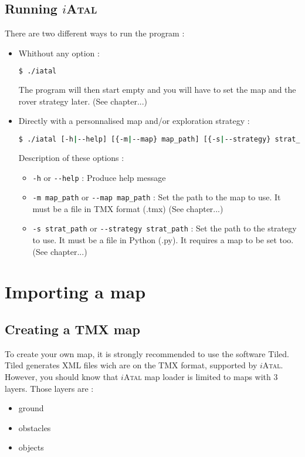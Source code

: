 \documentclass[a4paper,11pt]{article}
\newcommand\iAtal{$i$\textsc{Atal}}
\begin{document}
\subsection{Running \iAtal{}}
There are two different ways to run the program :
\begin{itemize}
\item Whithout any option :
\begin{lstlisting}[language=sh]
$ ./iatal
\end{lstlisting}
  The program will then start empty and you will have to set the map
  and the rover strategy later. (See chapter...)
  
\item Directly with a personnalised map and/or exploration strategy :
\begin{lstlisting}[language=sh]
$ ./iatal [-h|--help] [{-m|--map} map_path] [{-s|--strategy} strat_path]
\end{lstlisting}
  Description of these options :
  \begin{itemize}
  \item \verb!-h! or \verb!--help! : Produce help message
  \item \verb!-m map_path! or \verb!--map map_path! : Set the path to
    the map to use. It must be a file in TMX format (.tmx) (See
    chapter...)
  \item \verb!-s strat_path! or \verb!--strategy strat_path! : Set the
    path to the strategy to use. It must be a file in Python (.py). It
    requires a map to be set too. (See chapter...)
  \end{itemize}
\end{itemize}

\section{Importing a map}

\subsection{Creating a TMX map}

To create your own map, it is strongly recommended to use the software
Tiled\cite{tiled}.  Tiled generates XML files wich are on the TMX
format, supported by \iAtal{}. However, you should know that \iAtal{} map
loader is limited to maps with 3 layers. Those layers are :
\begin{itemize}
 \item ground
 \item obstacles
 \item objects
\end{itemize}
\label{avaibleLayers}
\end{document}

